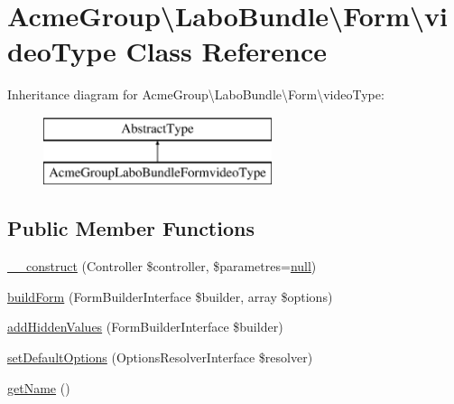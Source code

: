 \hypertarget{class_acme_group_1_1_labo_bundle_1_1_form_1_1video_type}{\section{Acme\+Group\textbackslash{}Labo\+Bundle\textbackslash{}Form\textbackslash{}video\+Type Class Reference}
\label{class_acme_group_1_1_labo_bundle_1_1_form_1_1video_type}
}
Inheritance diagram for Acme\+Group\textbackslash{}Labo\+Bundle\textbackslash{}Form\textbackslash{}video\+Type\+:\begin{figure}[H]
\begin{center}
\leavevmode
\includegraphics[height=2.000000cm]{class_acme_group_1_1_labo_bundle_1_1_form_1_1video_type}
\end{center}
\end{figure}
\subsection*{Public Member Functions}
\begin{DoxyCompactItemize}
\item 
\hyperlink{class_acme_group_1_1_labo_bundle_1_1_form_1_1video_type_af2a8e2b548e128b25581d66535c72ee2}{\+\_\+\+\_\+construct} (Controller \$controller, \$parametres=\hyperlink{validate_8js_afb8e110345c45e74478894341ab6b28e}{null})
\item 
\hyperlink{class_acme_group_1_1_labo_bundle_1_1_form_1_1video_type_a9ced42160197c45dc00aa63997e242df}{build\+Form} (Form\+Builder\+Interface \$builder, array \$options)
\item 
\hyperlink{class_acme_group_1_1_labo_bundle_1_1_form_1_1video_type_ad5baf736165876ae016b5368c10e36f5}{add\+Hidden\+Values} (Form\+Builder\+Interface \$builder)
\item 
\hyperlink{class_acme_group_1_1_labo_bundle_1_1_form_1_1video_type_ad78e5843d10e2c10770ff68957196de9}{set\+Default\+Options} (Options\+Resolver\+Interface \$resolver)
\item 
\hyperlink{class_acme_group_1_1_labo_bundle_1_1_form_1_1video_type_a4d9900b6165e705f358c22ed29a0d0c3}{get\+Name} ()
\end{DoxyCompactItemize}


